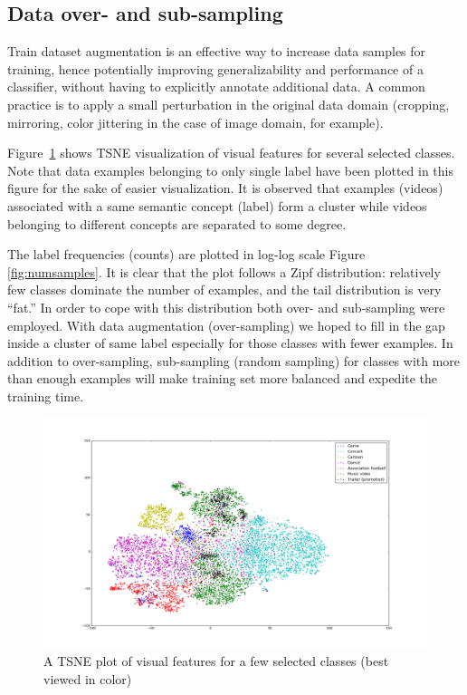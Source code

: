 \documentclass[runningheads]{llncs}
\begin{document}
\subsection{Data over- and sub-sampling} \label{sub:augmentation}
Train dataset augmentation is an effective way to increase data samples for training, hence potentially improving generalizability and performance of a classifier, without having to explicitly annotate additional data.
A common practice is to apply a small perturbation in the original data domain (cropping, mirroring, color jittering in the case of image domain, for example).

Figure~\ref{fig:tsne} shows TSNE visualization of visual features for several selected classes.
Note that data examples belonging to only single label have been plotted in this figure for the sake of easier visualization.
It is observed that examples (videos) associated with a same semantic concept (label) form a cluster while videos belonging to different concepts are separated to some degree.

The label frequencies (counts) are plotted in log-log scale Figure \ref{fig:numsamples}.
It is clear that the plot follows a Zipf distribution: relatively few classes dominate the number of examples, and the tail distribution is very ``fat.''
In order to cope with this distribution both over- and sub-sampling were employed.
With data augmentation (over-sampling) we hoped to fill in the gap inside a cluster of same label especially for those classes with fewer examples.
In addition to over-sampling, sub-sampling (random sampling) for classes with more than enough examples will make training set more balanced and expedite the training time.

\begin{figure}
  \includegraphics[width=\linewidth]{../figures/tsne-vfeat-large2.png}
  \caption{A TSNE plot of visual features for a few selected classes (best viewed in color)}
  \label{fig:tsne}
\end{figure}
\end{document}
